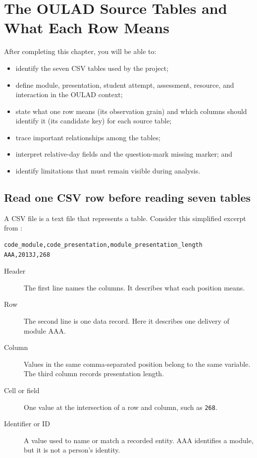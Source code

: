\chapter{The OULAD Source Tables and What Each Row Means}
\label{ch:oulad-data}

\begin{learningobjectives}
After completing this chapter, you will be able to:
\begin{itemize}
  \item identify the seven CSV tables used by the project;
  \item define module, presentation, student attempt, assessment, resource, and
    interaction in the OULAD context;
  \item state what one row means (its observation grain) and which columns
    should identify it (its candidate key) for each source table;
  \item trace important relationships among the tables;
  \item interpret relative-day fields and the question-mark missing marker; and
  \item identify limitations that must remain visible during analysis.
\end{itemize}
\end{learningobjectives}

\section{Read one CSV row before reading seven tables}

A CSV file is a text file that represents a table. Consider this simplified
excerpt from :

\begin{lstlisting}[caption={A header and one illustrative CSV data row}]
code_module,code_presentation,module_presentation_length
AAA,2013J,268
\end{lstlisting}

\begin{description}
  \item[Header] The first line names the columns. It describes what each
    position means.
  \item[Row] The second line is one data record. Here it describes one delivery
    of module AAA.
  \item[Column] Values in the same comma-separated position belong to the same
    variable. The third column records presentation length.
  \item[Cell or field] One value at the intersection of a row and column, such
    as \texttt{268}.
  \item[Identifier or ID] A value used to name or match a recorded entity. AAA
    identifies a module, but it is not a person's identity.
\end{description}

